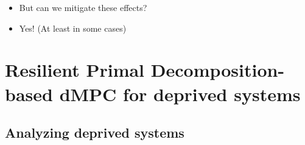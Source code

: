 \documentclass[aspectratio=169]{beamer}
\begin{document}
\begin{frame}{}
  \begin{itemize}[<+(1)->]
    \item But can we mitigate these effects?
    \item Yes! \pause (At least in some cases)
  \end{itemize}

\end{frame}

\section{Resilient Primal Decomposition-based dMPC for deprived systems}
\subsection{Analyzing deprived systems}
\end{document}
